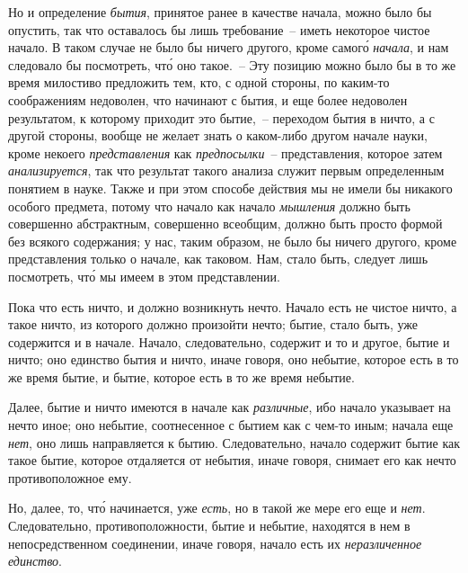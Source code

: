 Но и определение \emph{бытия}, принятое ранее в качестве
начала, можно было бы опустить, так что оставалось бы
лишь требование~-- иметь некоторое чистое начало. В таком
случае не было бы ничего другого, кроме самог\'о
\emph{начала}, и нам следовало бы посмотреть, чт\'о оно такое.~--
Эту позицию можно было бы в то же время милостиво
предложить тем, кто, с одной стороны, по каким-то соображениям
недоволен, что начинают с бытия, и еще более
недоволен результатом, к которому приходит это
бытие,~-- переходом бытия в ничто, а с другой стороны,
вообще не желает знать о каком-либо другом начале
науки, кроме некоего \emph{представления} как \emph{предпосылки}~--
представления, которое затем \emph{анализируется}, так что результат
такого анализа служит первым определенным
понятием в науке. Также и при этом способе действия
мы не имели бы никакого особого предмета, потому что
начало как начало \emph{мышления} должно быть совершенно
абстрактным, совершенно всеобщим, должно быть просто
формой без всякого содержания; у нас, таким образом,
не было бы ничего другого, кроме представления только
о начале, как таковом. Нам, стало быть, следует лишь
посмотреть, чт\'о мы имеем в этом представлении.

Пока что есть ничто, и должно возникнуть нечто. Начало
есть не чистое ничто, а такое ничто, из которого
должно произойти нечто; бытие, стало быть, уже содержится
и в начале. Начало, следовательно, содержит и то
и другое, бытие и ничто; оно единство бытия и ничто,
иначе говоря, оно небытие, которое есть в то же время
бытие, и бытие, которое есть в то же время небытие.

Далее, бытие и ничто имеются в начале как \emph{различные},
ибо начало указывает на нечто иное; оно небытие,
соотнесенное с бытием как с чем-то иным; начала еще
\emph{нет}, оно лишь направляется к бытию. Следовательно, начало
содержит бытие как такое бытие, которое отдаляется
от небытия, иначе говоря, снимает его как нечто противоположное
ему.

Но, далее, то, чт\'о начинается, уже \emph{есть}, но в такой
же мере его еще и \emph{нет}. Следовательно, противоположности,
бытие и небытие, находятся в нем в непосредственном
соединении, иначе говоря, начало есть их \emph{неразличенное
единство}.

